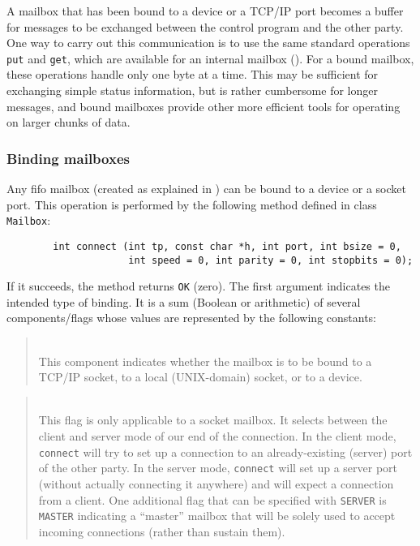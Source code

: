 A mailbox that has been bound to a device or a TCP/IP port becomes a buffer
for messages to be exchanged between the control program and the other party.
One way to carry out this communication is to use the same standard operations
{\tt put} and {\tt get}, which are available for an internal mailbox
().
For a bound mailbox, these operations handle only one byte at a time.
This may be sufficient for exchanging simple status information,
but is rather cumbersome for longer messages, and bound mailboxes provide
other more efficient tools for operating on larger chunks of data.

\subsubsection{Binding mailboxes}
\label{rm_mb_bo_bi}

Any fifo mailbox (created as explained in )
can be bound to a device or a socket port.
This operation is performed by the following method defined in class
{\tt Mailbox}:
\begin{verbatim}
        int connect (int tp, const char *h, int port, int bsize = 0,
                     int speed = 0, int parity = 0, int stopbits = 0);
\end{verbatim}
If it succeeds, the method returns {\tt OK} (zero).
The first argument indicates the intended type of binding.
It is a sum (Boolean or arithmetic) of several components/flags
whose values are represented by the following constants:

\medskip

\begin{quote}
\noindent{}\\ \hspace{0in}
This component indicates whether the mailbox is to be bound to a
TCP/IP socket, to a local (UNIX-domain) socket,
or to a device.
\end{quote}

\begin{quote}
\noindent{}\\ \hspace{0in}
This flag is only applicable to a socket mailbox.
It selects between the client and server mode of our end of the
connection.
In the client mode, {\tt connect} will try to set up a connection to an
already-existing (server) port of the other party.
In the server mode, {\tt connect} will set up a server port (without
actually connecting it anywhere) and will expect a connection from a client.
One additional flag that can be specified with {\tt SERVER} is {\tt MASTER}
indicating a ``master'' mailbox that will be solely used to
accept incoming connections (rather than sustain them).
\end{quote}


